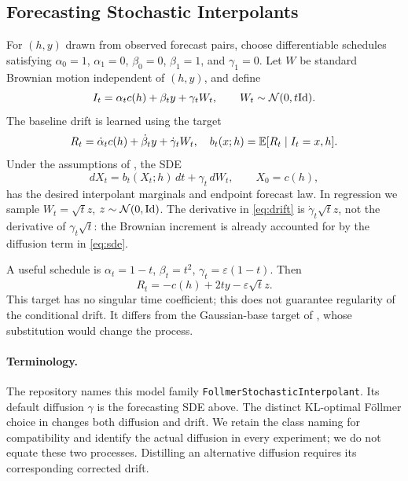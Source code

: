 \subsection{Forecasting Stochastic Interpolants}
For $(h,y)$ drawn from observed forecast pairs, choose differentiable schedules satisfying $\alpha_0=1$, $\alpha_1=0$, $\beta_0=0$, $\beta_1=1$, and $\gamma_1=0$. Let $W$ be standard Brownian motion independent of $(h,y)$, and define
\begin{equation}
 I_t=\alpha_t c(h)+\beta_t y+\gamma_t W_t,
 \qquad W_t\sim\mathcal{N}(0,t\mathrm{Id}).
 \label{eq:interpolant}
\end{equation}
The baseline drift is learned using the target
\begin{equation}
 R_t=\dot\alpha_t c(h)+\dot\beta_t y+\dot\gamma_t W_t,
 \quad b_t(x;h)=\mathbb{E}[R_t\mid I_t=x,h].
 \label{eq:drift}
\end{equation}
Under the assumptions of \citet{chen2024forecasting}, the SDE
\begin{equation}
 dX_t=b_t(X_t;h)\,dt+\gamma_t\,dW_t,
 \qquad X_0=c(h),
 \label{eq:sde}
\end{equation}
has the desired interpolant marginals and endpoint forecast law. In regression we sample $W_t=\sqrt{t}z$, $z\sim\mathcal{N}(0,\mathrm{Id})$. The derivative in \eqref{eq:drift} is $\dot\gamma_t\sqrt{t}z$, not the derivative of $\gamma_t\sqrt{t}$: the Brownian increment is already accounted for by the diffusion term in \eqref{eq:sde}.

A useful schedule is $\alpha_t=1-t$, $\beta_t=t^2$, $\gamma_t=\varepsilon(1-t)$. Then
\begin{equation}
 R_t=-c(h)+2ty-\varepsilon\sqrt{t}z.
 \label{eq:target}
\end{equation}
This target has no singular time coefficient; this does not guarantee regularity of the conditional drift. It differs from the Gaussian-base target of \citet{pan2026itomaps}, whose substitution would change the process.

\paragraph{Terminology.} The repository names this model family \texttt{FollmerStochasticInterpolant}. Its default diffusion $\gamma$ is the forecasting SDE above. The distinct KL-optimal F\"ollmer choice in \citet{chen2024forecasting} changes both diffusion and drift. We retain the class naming for compatibility and identify the actual diffusion in every experiment; we do not equate these two processes. Distilling an alternative diffusion requires its corresponding corrected drift.
